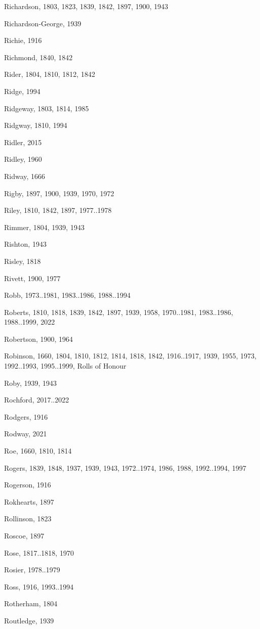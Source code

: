 \begin{theindex}
\item Richardson, 1803, 1823, 1839, 1842, 1897, 1900, 1943
\item Richardson-George, 1939
\item Richie, 1916
\item Richmond, 1840, 1842
\item Rider, 1804, 1810, 1812, 1842
\item Ridge, 1994
\item Ridgeway, 1803, 1814, 1985
\item Ridgway, 1810, 1994
\item Ridler, 2015
\item Ridley, 1960
\item Ridway, 1666
\item Rigby, 1897, 1900, 1939, 1970, 1972
\item Riley, 1810, 1842, 1897, 1977..1978
\item Rimmer, 1804, 1939, 1943
\item Rishton, 1943
\item Risley, 1818
\item Rivett, 1900, 1977
\item Robb, 1973..1981, 1983..1986, 1988..1994
\item Roberts, 1810, 1818, 1839, 1842, 1897, 1939, 1958, 1970..1981, 1983..1986, 1988..1999, 2022
\item Robertson, 1900, 1964
\item Robinson, 1660, 1804, 1810, 1812, 1814, 1818, 1842, 1916..1917, 1939, 1955, 1973, 1992..1993, 1995..1999, Rolls of Honour
\item Roby, 1939, 1943
\item Rochford, 2017..2022
\item Rodgers, 1916
\item Rodway, 2021
\item Roe, 1660, 1810, 1814
\item Rogers, 1839, 1848, 1937, 1939, 1943, 1972..1974, 1986, 1988, 1992..1994, 1997
\item Rogerson, 1916
\item Rokhearts, 1897
\item Rollinson, 1823
\item Roscoe, 1897
\item Rose, 1817..1818, 1970
\item Rosier, 1978..1979
\item Ross, 1916, 1993..1994
\item Rotherham, 1804
\item Routledge, 1939

\end{theindex}
